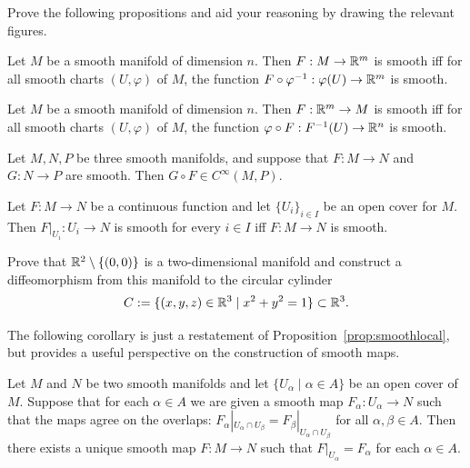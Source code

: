 \begin{exercise}
  Prove the following propositions and aid your reasoning by drawing the relevant figures.
  \begin{proposition}
    Let $M$ be a smooth manifold of dimension $n$.
    Then $F:M\to\mathbb{R}^m$ is smooth iff for all smooth charts $(U,\varphi)$ of $M$, the function $F\circ\varphi^{-1}:\varphi(U)\to\mathbb{R}^m$ is smooth.
  \end{proposition}
  \begin{proposition}
    Let $M$ be a smooth manifold of dimension $n$.
    Then $F:\mathbb{R}^m\to M$ is smooth iff for all smooth charts $(U,\varphi)$ of $M$, the function $\varphi\circ F:F^{-1}(U)\to\mathbb{R}^n$ is smooth.
  \end{proposition}
  \begin{proposition}
    Let $M, N, P$ be three smooth manifolds, and suppose that $F:M\to N$ and $G:N\to P$ are smooth.
    Then $G\circ F\in C^\infty(M, P)$.
  \end{proposition}
  
  \begin{proposition}\label{prop:smoothlocal}
    Let $F:M\to N$ be a continuous function and let $\{U_i\}_{i\in I}$ be an open cover for $M$. Then $F|_{U_i}:U_i \to N$ is smooth for every $i\in I$ iff $F:M\to N$ is smooth.
  \end{proposition}
\end{exercise}

\begin{exercise}[\textit{[homework 1]}]
  Prove that $\mathbb{R}^2\setminus\{(0,0)\}$ is a two-dimensional manifold and construct a diffeomorphism from this manifold to the circular cylinder
  \begin{equation}
    C := \{ (x,y,z)\in\mathbb{R}^3 \mid x^2+y^2 = 1\}\subset\mathbb{R}^3.
  \end{equation}
\end{exercise}

The following corollary is just a restatement of Proposition~\ref{prop:smoothlocal}, but provides a useful perspective on the construction of smooth maps.

\begin{proposition}
  Let $M$ and $N$ be two smooth manifolds and let $\{U_\alpha\mid\alpha\in A\}$ be an open cover of $M$.
  Suppose that for each $\alpha\in A$ we are given a smooth map $F_
  \alpha:U_\alpha\to N$ such that the maps agree on the overlaps: $F_\alpha|_{U_\alpha\cap U_\beta} = F_\beta|_{U_\alpha\cap U_\beta}$ for all $\alpha,\beta\in A$. 
  Then there exists a unique smooth map $F:M\to N$ such that $F|_{U_\alpha} = F_\alpha$ for each $\alpha\in A$.
\end{proposition}

